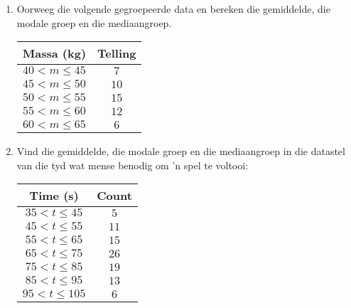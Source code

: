 \begin{exercises}{}{
  \begin{enumerate}[itemsep=8pt, label=\textbf{\arabic*}.]

  \item Oorweeg die volgende gegroepeerde data en bereken die gemiddelde, die modale groep en die mediaangroep.
\\
    \begin{center}
      \begin{tabular}{|c|c|}\hline
      
        \textbf{Massa (kg)} & \textbf{Telling} \\\hline
     
        $40 < m \leq 45$ & $7$ \\\hline
        $45 < m \leq 50$ & $10$ \\\hline
        $50 < m \leq 55$ & $15$ \\\hline
        $55 < m \leq 60$ & $12$ \\\hline
        $60 < m \leq 65$ & $6$ \\\hline
  
      \end{tabular}
    \end{center}

  \item Vind die gemiddelde, die modale groep en die mediaangroep in die datastel van die tyd wat mense benodig om ’n spel te voltooi:
\\
    \begin{center}
      \begin{tabular}{|c|c|} \hline

       \textbf{Time (s)} & \textbf{Count} \\ \hline

        $35 < t \leq 45$ & $5$ \\\hline
        $45 < t \leq 55$ & $11$ \\\hline
        $55 < t \leq 65$ & $15$ \\\hline
        $65 < t \leq 75$ & $26$ \\\hline
        $75 < t \leq 85$ & $19$ \\\hline
        $85 < t \leq 95$ & $13$ \\\hline
        $95 < t \leq 105$ & $6$ \\\hline


\end{tabular}
\end{center}
\end{enumerate}}
\end{exercises}

